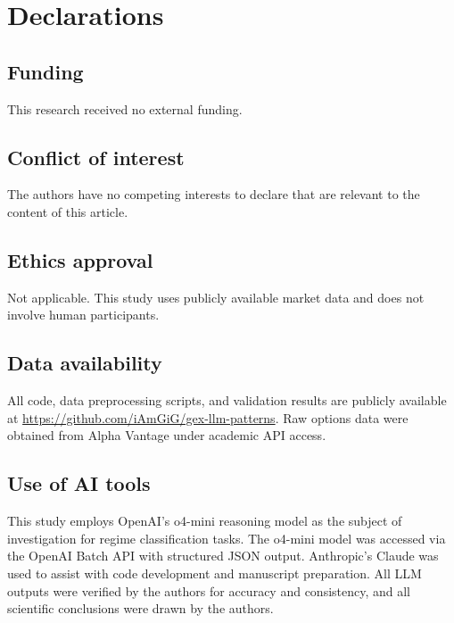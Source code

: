 \documentclass[smallextended]{svjour3}
\begin{document}
\section*{Declarations}

\subsection*{Funding}
This research received no external funding.

\subsection*{Conflict of interest}
The authors have no competing interests to declare that are relevant to the content of this article.

\subsection*{Ethics approval}
Not applicable. This study uses publicly available market data and does not involve human participants.

\subsection*{Data availability}
All code, data preprocessing scripts, and validation results are publicly available at \url{https://github.com/iAmGiG/gex-llm-patterns}. Raw options data were obtained from Alpha Vantage under academic API access.

\subsection*{Use of AI tools}
This study employs OpenAI's o4-mini reasoning model as the subject of investigation for regime classification tasks. The o4-mini model was accessed via the OpenAI Batch API with structured JSON output. Anthropic's Claude was used to assist with code development and manuscript preparation. All LLM outputs were verified by the authors for accuracy and consistency, and all scientific conclusions were drawn by the authors.



\end{document}
